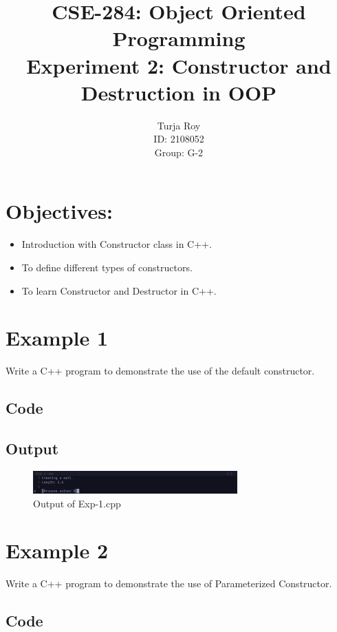 \documentclass[12pt]{article}
\title{
    CSE-284: Object Oriented Programming \\
    Experiment 2: Constructor and Destruction in OOP
}
\author{
    Turja Roy \\ 
    ID: 2108052 \\ 
    Group: G-2
}
\date{}
\begin{document}
\maketitle

\section*{Objectives:}
\begin{itemize}
    \item Introduction with Constructor class in C++.
    \item To define different types of constructors.
    \item To learn Constructor and Destructor in C++.
\end{itemize}


\FloatBarrier
\section*{Example 1}
Write a C++ program to demonstrate the use of the default constructor.

\subsection*{Code}


\subsection*{Output}
\vspace{-1em}
\begin{figure}[htpb]
    \centering
    \includegraphics[width=0.7\textwidth]{Exp-1.png}
    \caption{Output of Exp-1.cpp}
\end{figure}


\FloatBarrier
\section*{Example 2}
Write a C++ program to demonstrate the use of Parameterized Constructor.

\subsection*{Code}

\end{document}
